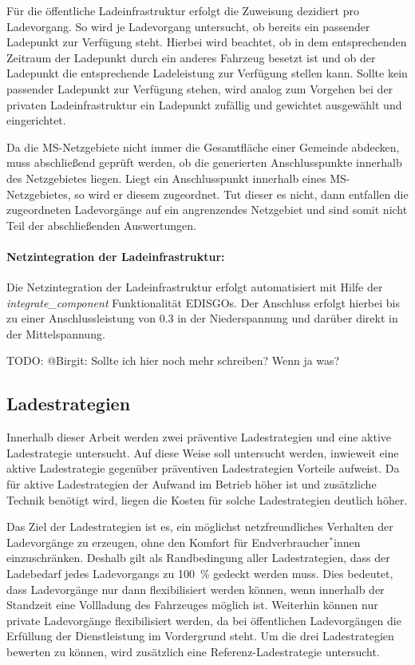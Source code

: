 Für die öffentliche Ladeinfrastruktur erfolgt die Zuweisung dezidiert pro Ladevorgang.
So wird je Ladevorgang untersucht, ob bereits ein passender Ladepunkt zur Verfügung steht.
Hierbei wird beachtet, ob in dem entsprechenden Zeitraum der Ladepunkt durch ein anderes Fahrzeug besetzt ist und ob der Ladepunkt die entsprechende Ladeleistung zur Verfügung stellen kann.
Sollte kein passender Ladepunkt zur Verfügung stehen, wird analog zum Vorgehen bei der privaten Ladeinfrastruktur ein Ladepunkt zufällig und gewichtet ausgewählt und eingerichtet.\medskip

Da die \gls{MS}-Netzgebiete nicht immer die Gesamtfläche einer Gemeinde abdecken, muss abschließend geprüft werden, ob die generierten Anschlusspunkte innerhalb des Netzgebietes liegen.
Liegt ein Anschlusspunkt innerhalb eines \gls{MS}-Netzgebietes, so wird er diesem zugeordnet.
Tut dieser es nicht, dann entfallen die zugeordneten Ladevorgänge auf ein angrenzendes Netzgebiet und sind somit nicht Teil der abschließenden Auswertungen.


\paragraph{Netzintegration der Ladeinfrastruktur:}

Die Netzintegration der Ladeinfrastruktur erfolgt automatisiert mit Hilfe der \textit{integrate\_component} Funktionalität \glspl{EDISGO}.
Der Anschluss erfolgt hierbei bis zu einer Anschlussleistung von \SI{0.3}{\mva} in der Niederspannung und darüber direkt in der Mittelspannung.

{\color{red} TODO: @Birgit: Sollte ich hier noch mehr schreiben? Wenn ja was?}


\subsection{Ladestrategien}\label{chap:theo_strategies}

Innerhalb dieser Arbeit werden zwei präventive Ladestrategien und eine aktive Ladestrategie untersucht.
Auf diese Weise soll untersucht werden, inwieweit eine aktive Ladestrategie gegenüber präventiven Ladestrategien Vorteile aufweist.
Da für aktive Ladestrategien der Aufwand im Betrieb höher ist und zusätzliche Technik benötigt wird, liegen die Kosten für solche Ladestrategien deutlich höher.\medskip

Das Ziel der Ladestrategien ist es, ein möglichst netzfreundliches Verhalten der Ladevorgänge zu erzeugen, ohne den Komfort für Endverbraucher$^*$innen einzuschränken.
Deshalb gilt als Randbedingung aller Ladestrategien, dass der Ladebedarf jedes Ladevorgangs zu \SI{100}{\percent} gedeckt werden muss.
Dies bedeutet, dass Ladevorgänge nur dann flexibilisiert werden können, wenn innerhalb der Standzeit eine Vollladung des Fahrzeuges möglich ist.
Weiterhin können nur private Ladevorgänge flexibilisiert werden, da bei öffentlichen Ladevorgängen die Erfüllung der Dienstleistung im Vordergrund steht.
Um die drei Ladestrategien bewerten zu können, wird zusätzlich eine Referenz-Ladestrategie untersucht.


